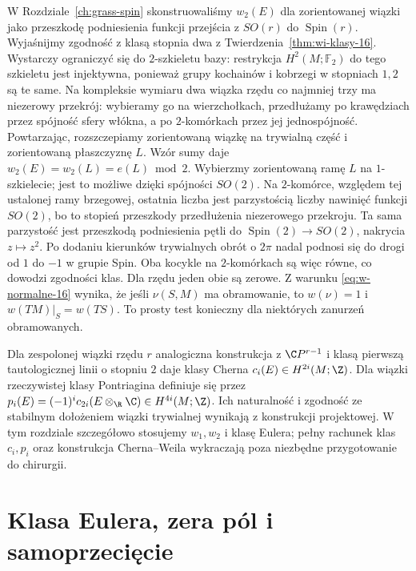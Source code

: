 \begin{uwaga}
W Rozdziale~\ref{ch:grass-spin}
skonstruowaliśmy
$w_2(E)$ dla zorientowanej
wiązki jako przeszkodę
podniesienia funkcji
przejścia z $SO(r)$
do $\operatorname{Spin}(r)$.
Wyjaśnijmy zgodność z klasą stopnia dwa z
Twierdzenia~\ref{thm:wi-klasy-16}. Wystarczy ograniczyć
się do $2$-szkieletu bazy: restrykcja $H^2(M;\mathbb F_2)$
do tego szkieletu jest injektywna, ponieważ grupy
kochainów i kobrzegi w stopniach $1,2$ są te same.
Na kompleksie wymiaru dwa wiązka rzędu co najmniej trzy
ma niezerowy przekrój: wybieramy go na wierzchołkach,
przedłużamy po krawędziach przez spójność sfery włókna,
a po $2$-komórkach przez jej jednospójność.
Powtarzając, rozszczepiamy zorientowaną wiązkę na
trywialną część i zorientowaną płaszczyznę $L$.
Wzór sumy daje $w_2(E)=w_2(L)=e(L)\bmod2$.
Wybierzmy zorientowaną ramę $L$ na $1$-szkielecie;
jest to możliwe dzięki spójności $SO(2)$.
Na $2$-komórce, względem tej ustalonej ramy brzegowej,
ostatnia liczba jest parzystością liczby nawinięć
funkcji $SO(2)$, bo to
stopień przeszkody przedłużenia niezerowego przekroju.
Ta sama parzystość jest przeszkodą podniesienia pętli
do $\operatorname{Spin}(2)\to SO(2)$, nakrycia $z\mapsto z^2$.
Po dodaniu kierunków trywialnych obrót o $2\pi$
nadal podnosi się do drogi od $1$ do $-1$ w grupie Spin.
Oba kocykle na $2$-komórkach są więc równe,
co dowodzi zgodności klas. Dla rzędu jeden obie są zerowe.
Z warunku
\eqref{eq:w-normalne-16}
wynika, że jeśli
$\nu(S,M)$ ma obramowanie,
to $w(\nu)=1$ i
$w(TM)|_S=w(TS)$.
To prosty test konieczny
dla niektórych zanurzeń
obramowanych.
\end{uwaga}

\begin{uwaga}
Dla zespolonej wiązki
rzędu $r$ analogiczna
konstrukcja z
$\C P^{r-1}$
i klasą pierwszą
tautologicznej linii
o stopniu $2$
daje klasy Cherna
$c_i(E)\in H^{2i}(M;\Z)$.
Dla wiązki rzeczywistej
klasy Pontriagina
definiuje się przez
$p_i(E)=(-1)^i
c_{2i}(E\otimes_\R\C)
\in H^{4i}(M;\Z)$.
Ich naturalność i
zgodność ze stabilnym
dołożeniem wiązki
trywialnej wynikają
z konstrukcji projektowej.
W tym rozdziale
szczegółowo stosujemy
$w_1,w_2$ i klasę
Eulera; pełny rachunek
klas $c_i,p_i$
oraz konstrukcja
Cherna--Weila
wykraczają poza
niezbędne przygotowanie
do chirurgii.
\end{uwaga}

\section{Klasa Eulera, zera pól i samoprzecięcie}
\label{sec:klasy-eulera-16}

